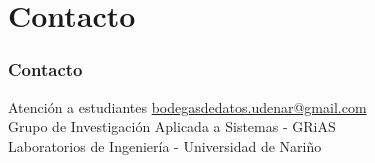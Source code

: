 \documentclass{beamer}
\begin{document}
\section{Contacto}
\begin{frame}\frametitle{Contacto}
  \begin{block}{Atención a estudiantes}
    \centering
    \vspace{5mm}
    \href{mailto://bodegasdedatos.udenar@gmail.com}{\url{bodegasdedatos.udenar@gmail.com}}\\
    Grupo de Investigación Aplicada a Sistemas - GRiAS\\
    Laboratorios de Ingeniería - Universidad de Nariño
  \end{block}
\end{frame}

% 
\end{document}
